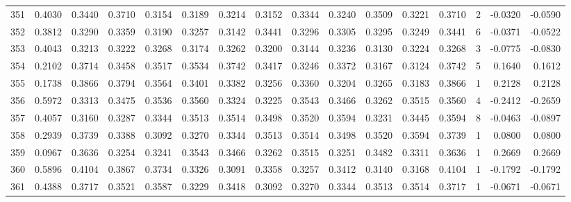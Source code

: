 \begin{tabular}{lrrrrrrrrrrrrrrr}
351 &      0.4030 &  0.3440 &  0.3710 &  0.3154 &  0.3189 &  0.3214 &  0.3152 &  0.3344 &  0.3240 &  0.3509 &   0.3221 &     0.3710 &      2 &                   -0.0320 &                    -0.0590 \\
352 &      0.3812 &  0.3290 &  0.3359 &  0.3190 &  0.3257 &  0.3142 &  0.3441 &  0.3296 &  0.3305 &  0.3295 &   0.3249 &     0.3441 &      6 &                   -0.0371 &                    -0.0522 \\
353 &      0.4043 &  0.3213 &  0.3222 &  0.3268 &  0.3174 &  0.3262 &  0.3200 &  0.3144 &  0.3236 &  0.3130 &   0.3224 &     0.3268 &      3 &                   -0.0775 &                    -0.0830 \\
354 &      0.2102 &  0.3714 &  0.3458 &  0.3517 &  0.3534 &  0.3742 &  0.3417 &  0.3246 &  0.3372 &  0.3167 &   0.3124 &     0.3742 &      5 &                    0.1640 &                     0.1612 \\
355 &      0.1738 &  0.3866 &  0.3794 &  0.3564 &  0.3401 &  0.3382 &  0.3256 &  0.3360 &  0.3204 &  0.3265 &   0.3183 &     0.3866 &      1 &                    0.2128 &                     0.2128 \\
356 &      0.5972 &  0.3313 &  0.3475 &  0.3536 &  0.3560 &  0.3324 &  0.3225 &  0.3543 &  0.3466 &  0.3262 &   0.3515 &     0.3560 &      4 &                   -0.2412 &                    -0.2659 \\
357 &      0.4057 &  0.3160 &  0.3287 &  0.3344 &  0.3513 &  0.3514 &  0.3498 &  0.3520 &  0.3594 &  0.3231 &   0.3445 &     0.3594 &      8 &                   -0.0463 &                    -0.0897 \\
358 &      0.2939 &  0.3739 &  0.3388 &  0.3092 &  0.3270 &  0.3344 &  0.3513 &  0.3514 &  0.3498 &  0.3520 &   0.3594 &     0.3739 &      1 &                    0.0800 &                     0.0800 \\
359 &      0.0967 &  0.3636 &  0.3254 &  0.3241 &  0.3543 &  0.3466 &  0.3262 &  0.3515 &  0.3251 &  0.3482 &   0.3311 &     0.3636 &      1 &                    0.2669 &                     0.2669 \\
360 &      0.5896 &  0.4104 &  0.3867 &  0.3734 &  0.3326 &  0.3091 &  0.3358 &  0.3257 &  0.3412 &  0.3140 &   0.3168 &     0.4104 &      1 &                   -0.1792 &                    -0.1792 \\
361 &      0.4388 &  0.3717 &  0.3521 &  0.3587 &  0.3229 &  0.3418 &  0.3092 &  0.3270 &  0.3344 &  0.3513 &   0.3514 &     0.3717 &      1 &                   -0.0671 &                    -0.0671 \\

\end{tabular}

